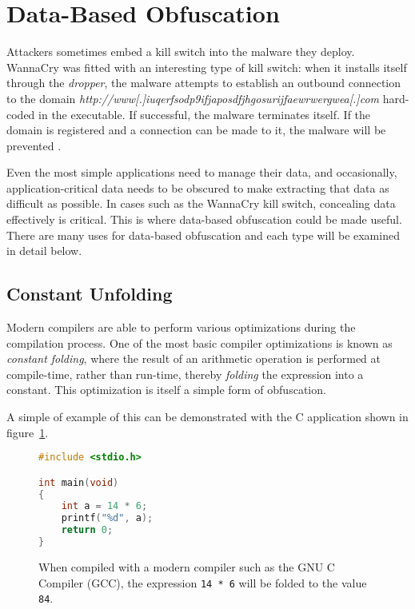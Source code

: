 \documentclass[conference]{IEEEtran}
\begin{document}
\section{Data-Based Obfuscation}
\label{sec:data-obf}
Attackers sometimes embed a kill switch into the malware they deploy. WannaCry was fitted with an interesting type of kill switch: when it installs itself through the \textit{dropper}, the malware attempts to establish an outbound connection to the domain \textit{http://www[.]iuqerfsodp9ifjaposdfj\linebreak{}hgosurijfaewrwergwea[.]com} hard-coded in the executable. If successful, the malware terminates itself. If the domain is registered and a connection can be made to it, the malware will be prevented \cite{b1}.

Even the most simple applications need to manage their data, and occasionally, application-critical data needs to be obscured to make extracting that data as difficult as possible. In cases such as the WannaCry kill switch, concealing data effectively is critical. This is where data-based obfuscation could be made useful. There are many uses for data-based obfuscation and each type will be examined in detail below.

\subsection{Constant Unfolding}
Modern compilers are able to perform various optimizations during the compilation process. One of the most basic compiler optimizations is known as \textit{constant folding}, where the result of an arithmetic operation is performed at compile-time, rather than run-time, thereby \textit{folding} the expression into a constant. This optimization is itself a simple form of obfuscation.

A simple of example of this can be demonstrated with the C application shown in figure~\ref{fig1}.

\begin{figure}[h]
\begin{lstlisting}[language=C,basicstyle=\footnotesize]
#include <stdio.h>

int main(void)
{
    int a = 14 * 6;
    printf("%d", a);
    return 0;
}
\end{lstlisting}
\caption{When compiled with a modern compiler such as the GNU C Compiler (GCC), the expression \texttt{14 * 6} will be folded to the value \texttt{84}.}
\label{fig1}
\end{figure}
\end{document}
